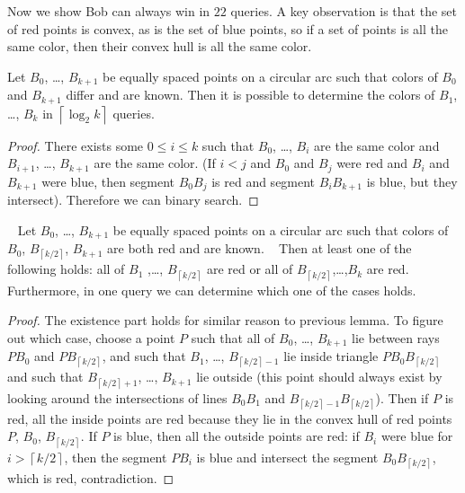 Now we show Bob can always win in $22$ queries.
A key observation is that the set of red points is convex,
as is the set of blue points, so if a set of points is all the same color,
then their convex hull is all the same color.
\begin{lemma*}
  Let $B_0$, \dots, $B_{k+1}$ be equally spaced points on a circular arc
  such that colors of $B_0$ and $B_{k+1}$ differ and are known.
  Then it is possible to determine the colors of $B_1$, \dots, $B_k$
	in $\left\lceil \log_2k \right\rceil$ queries.
\end{lemma*}
\begin{proof}
  There exists some $0\le i\le k$ such that $B_0$, \dots, $B_{i}$
  are the same color and $B_{i+1}$, \dots, $B_{k+1}$ are the same color.
  (If $i<j$ and $B_0$ and $B_j$ were red and $B_i$ and $B_{k+1}$ were blue,
  then segment $B_0B_j$ is red and segment $B_iB_{k+1}$ is blue,
  but they intersect).
  Therefore we can binary search.
\end{proof}
\begin{lemma*}
  Let $B_0$, \dots, $B_{k+1}$ be equally spaced points on a circular arc
  such that colors of $B_0$, $B_{\left\lceil k/2 \right\rceil}$, $B_{k+1}$
  are both red and are known.
  Then at least one of the following holds:
  all of $B_1$ ,\dots, $B_{\left\lceil k/2 \right\rceil}$ are red
  or all of $B_{\left\lceil k/2 \right\rceil}$,\dots,$B_k$ are red.
  Furthermore, in one query we can determine which one of the cases holds.
\end{lemma*}
\begin{proof}
  The existence part holds for similar reason to previous lemma.
  To figure out which case, choose a point $P$ such that
  all of $B_0$, \dots, $B_{k+1}$
  lie between rays $PB_0$ and $PB_{\left\lceil k/2 \right\rceil}$,
  and such that $B_1$, \dots, $B_{\left\lceil k/2 \right\rceil-1}$ lie inside
  triangle $PB_0B_{\left\lceil k/2 \right\rceil}$ and such that
  $B_{\left\lceil k/2 \right\rceil+1}$, \dots, $B_{k+1}$ lie outside
  (this point should always exist by looking around the intersections of lines $B_0B_1$ and
  $B_{\left\lceil k/2 \right\rceil-1}B_{\left\lceil k/2 \right\rceil}$).
  Then if $P$ is red, all the inside points are red
	because they lie in the convex hull of red points $P$, $B_0$, $B_{\left\lceil k/2 \right\rceil}$.
  If $P$ is blue, then all the outside points are red:
  if $B_i$ were blue for $i > \left\lceil k/2 \right\rceil$,
  then the segment $PB_i$ is blue and intersect the segment
  $B_0B_{\left\lceil k/2 \right\rceil}$, which is red, contradiction.
\end{proof}
